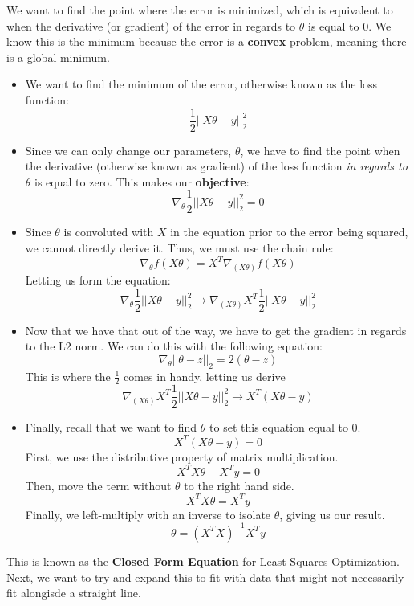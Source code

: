 \documentclass{article}
\begin{document}
We want to find the point where the error is minimized, which is equivalent to when the derivative (or gradient) of the error in regards to $\theta$ is equal to 0. We know this is the minimum because the error is a \textbf{convex} problem, meaning there is a global minimum. 
\begin{itemize}
    \item We want to find the minimum of the error, otherwise known as the loss function:
    $$\frac{1}{2}||X\theta - y||_2^2$$
    
    \item Since we can only change our parameters, $\theta$, we have to find the point when the derivative (otherwise known as gradient) of the loss function \textit{in regards to $\theta$} is equal to zero. This makes our \textbf{objective}:
    $$\nabla_\theta \frac{1}{2}||X\theta - y||_2^2 = 0$$
    
    \item Since $\theta$ is convoluted with $X$ in the equation prior to the error being squared, we cannot directly derive it. Thus, we must use the chain rule:
    $$\nabla_\theta f(X\theta) = X^T\nabla_{(X\theta)}f(X\theta) $$
    Letting us form the equation: 
    $$\nabla_\theta\frac{1}{2}||X\theta - y||_2^2 \rightarrow \nabla_{(X\theta)}X^T\frac{1}{2}||X\theta - y||_2^2$$
    
    \item Now that we have that out of the way, we have to get the gradient in regards to the L2 norm. We can do this with the following equation:
    $$\nabla_\theta||\theta - z||_2 = 2(\theta - z)$$
    This is where the $\frac{1}{2}$ comes in handy, letting us derive 
    $$\nabla_{(X\theta)}X^T\frac{1}{2}||X\theta - y||_2^2 \rightarrow X^T(X\theta - y)$$
    
    \item Finally, recall that we want to find $\theta$ to set this equation equal to 0. 
    $$X^T(X\theta - y) = 0$$
    First, we use the distributive property of matrix multiplication. 
    $$X^TX\theta - X^Ty = 0$$
    Then, move the term without $\theta$ to the right hand side.
    $$X^TX\theta = X^Ty$$
    Finally, we left-multiply with an inverse to isolate $\theta$, giving us our result.
    $$\theta = (X^TX)^{-1}X^Ty$$
\end{itemize}
This is known as the \textbf{Closed Form Equation} for Least Squares Optimization. Next, we want to try and expand this to fit with data that might not necessarily fit alongisde a straight line.
\end{document}
